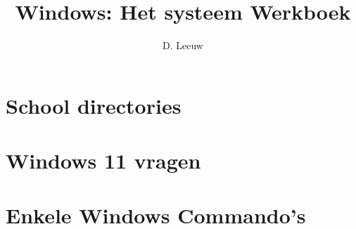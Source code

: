 \documentclass[a4paper,12pt,twoside,titlepage]{article}
\author{D. Leeuw}
\title{Windows: Het systeem Werkboek}
\date{\today\\
0.0.0
\vfill
\raggedright
\copyright\ 2025-2026 Dennis Leeuw\\
}
\begin{document}

\maketitle



\section{School directories}


\section{Windows 11 vragen}


\section{Enkele Windows Commando's}


\printindex
\end{document}
